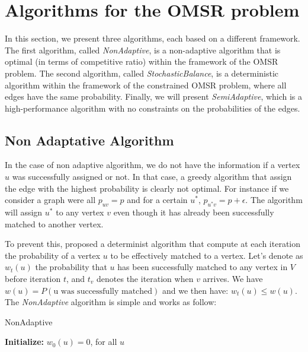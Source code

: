\documentclass[12pt, twocolumn]{article}
\begin{document}
\section{Algorithms for the OMSR problem}

\par
\hspace{\parindent}In this section, we present three algorithms, each based on a different framework. The first algorithm, called \textit{NonAdaptive}, is a non-adaptive algorithm that is optimal (in terms of competitive ratio) within the framework of the OMSR problem. The second algorithm, called \textit{StochasticBalance}, is a deterministic algorithm within the framework of the constrained OMSR problem, where all edges have the same probability. Finally, we will present \textit{SemiAdaptive}, which is a high-performance algorithm with no constraints on the probabilities of the edges.

\subsection{Non Adaptative Algorithm}
\label{sec:nonadapt}

\par
\hspace{\parindent}In the case of non adaptive algorithm, we do not have the information if a vertex $u$ was successfully assigned or not. In that case, a greedy algorithm that assign the edge with the highest probability is clearly not optimal. For instance if we consider a graph were all $p_{uv}=p$ and for a certain $u^*$, $p_{u^*v}=p+ \epsilon$. The algorithm will assign $u^*$ to any vertex $v$ even though it has already been successfully matched to another vertex.

\par
\hspace{\parindent}To prevent this, \cite{mehta2015} proposed a determinist algorithm that compute at each iteration the probability of a vertex $u$ to be effectively matched to a vertex. Let's denote as $w_t(u)$ the probability that $u$ has been successfully matched to any vertex in $V$ before iteration $t$, and $t_v$ denotes the iteration when $v$ arrives. We have $w(u) = P(\text{u was successfully matched})$ and we then have: $w_t(u) \leq w(u)$. The \textit{NonAdaptive} algorithm is simple and works as follow:


\begin{algorithm}[H]
\caption{NonAdaptive}
\label{alg:NonAdaptive}

\BlankLine
\textbf{Initialize:} \( w_0(u) = 0 \), for all \( u \)\;\\
\end{algorithm}
\end{document}
